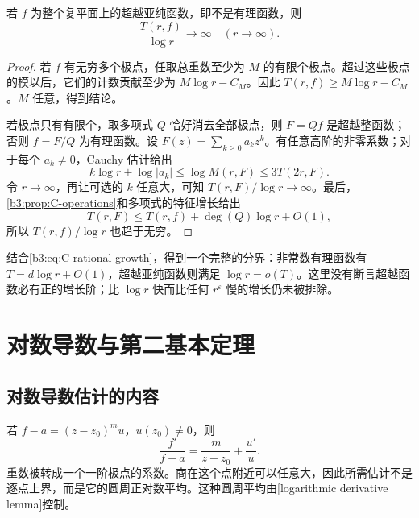 \begin{lemma}[超越增长]\label{b3:lem:C-transcendental-growth}
若 \(f\) 为整个复平面上的超越亚纯函数，即不是有理函数，则
\[
 \frac{T(r,f)}{\log r}\longrightarrow\infty
 \quad(r\to\infty).
\]
\end{lemma}
\begin{proof}
若 \(f\) 有无穷多个极点，任取总重数至少为 \(M\) 的有限个极点。超过这些极点的模以后，它们的计数贡献至少为 \(M\log r-C_M\)。因此 \(T(r,f)\ge M\log r-C_M\)。\(M\) 任意，得到结论。

若极点只有有限个，取多项式 \(Q\) 恰好消去全部极点，则 \(F=Qf\) 是超越整函数；否则 \(f=F/Q\) 为有理函数。设 \(F(z)=\sum_{k\ge0}a_kz^k\)。有任意高阶的非零系数；对于每个 \(a_k\ne0\)，Cauchy 估计给出
\[
 k\log r+\log|a_k|\le\log M(r,F)\le3T(2r,F).
\]
令 \(r\to\infty\)，再让可选的 \(k\) 任意大，可知 \(T(r,F)/\log r\to\infty\)。最后，\cref{b3:prop:C-operations}和多项式的特征增长给出
\[
 T(r,F)\le T(r,f)+\deg(Q)\log r+O(1),
\]
所以 \(T(r,f)/\log r\) 也趋于无穷。
\end{proof}

结合\eqref{b3:eq:C-rational-growth}，得到一个完整的分界：非常数有理函数有 \(T=d\log r+O(1)\)，超越亚纯函数则满足 \(\log r=o(T)\)。这里没有断言超越函数必有正的增长阶；比 \(\log r\) 快而比任何 \(r^\varepsilon\) 慢的增长仍未被排除。

\section{对数导数与第二基本定理}
\label{b3:sec:C03}

\subsection{对数导数估计的内容}
\label{b3:subsec:C0301}

若 \(f-a=(z-z_0)^m u\)，\(u(z_0)\ne0\)，则
\[
 \frac{f'}{f-a}=\frac m{z-z_0}+\frac{u'}u.
\]
重数被转成一个一阶极点的系数。商在这个点附近可以任意大，因此所需估计不是逐点上界，而是它的圆周正对数平均。这种圆周平均由[logarithmic derivative lemma]控制。

